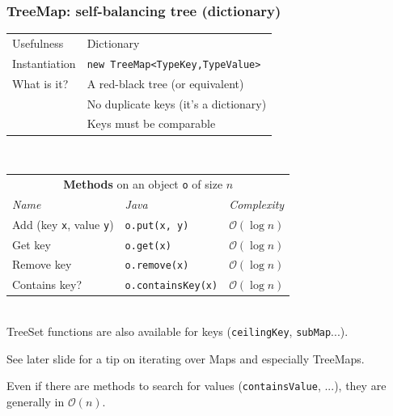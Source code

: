\documentclass[8pt,aspectratio=169]{beamer}
\begin{document}
\begin{frame}
\frametitle{TreeMap: self-balancing tree (dictionary)}
\centering
\begin{tabular}{ll}
	Usefulness & Dictionary\\
	Instantiation & \texttt{new TreeMap<TypeKey,TypeValue>}\\
	What is it? & A red-black tree (or equivalent)\\
	& \color{red} No duplicate keys (it's a dictionary)\\
	& \color{red} Keys must be comparable
\end{tabular}\\
\vspace{0.5cm}
\centering
\begin{tabular}{lll}
	\multicolumn{3}{c}{\textbf{Methods} on an object \texttt{o} of size $n$} \\
	\textit{Name} & \textit{Java} & \textit{Complexity} \\
	Add (key \texttt{x}, value \texttt{y})& \texttt{o.put(x, y)} & $\mathcal{O}(\log n)$\\
	Get key & \texttt{o.get(x)} & $\mathcal{O}(\log n)$\\
	Remove key & \texttt{o.remove(x)} & $\mathcal{O}(\log n)$\\
	Contains key? & \texttt{o.containsKey(x)} & $\mathcal{O}(\log n)$\\
\end{tabular}\\
\vspace{0.5cm}
\color{blue} TreeSet functions are also available for keys (\texttt{ceilingKey}, \texttt{subMap}...).

\color{blue} See later slide for a tip on iterating over Maps and especially TreeMaps.

\color{red} Even if there are methods to search for values (\texttt{containsValue}, ...), they are generally in $\mathcal{O}(n)$.
\end{frame}
\end{document}
